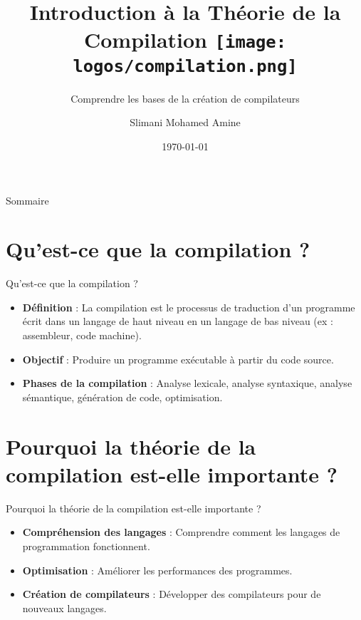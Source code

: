 \documentclass{clbeamer2024}
\title{
        Introduction à la Théorie de la Compilation
	\texttt{[image: logos/compilation.png]} \hfill
}
\subtitle{Comprendre les bases de la création de compilateurs}
\author{Slimani Mohamed Amine}
\institute{EHTP}
\date{\today}
\begin{document}
	\setcounter{framenumber}{-1}
	\frame{\titlepage}
	
	
	
	\begin{frame}{Sommaire}
		\tableofcontents
	\end{frame}
	
	
	\section{Qu'est-ce que la compilation ?}
	\begin{frame}{Qu'est-ce que la compilation ?}
		\begin{itemize}
			\item \textbf{Définition} : La compilation est le processus de traduction d'un programme écrit dans un langage de haut niveau en un langage de bas niveau (ex : assembleur, code machine).
			\item \textbf{Objectif} : Produire un programme exécutable à partir du code source.
			\item \textbf{Phases de la compilation} : Analyse lexicale, analyse syntaxique, analyse sémantique, génération de code, optimisation.
		\end{itemize}
	\end{frame}
	
	\section{Pourquoi la théorie de la compilation est-elle importante ?}
	\begin{frame}{Pourquoi la théorie de la compilation est-elle importante ?}
		\begin{itemize}
			\item \textbf{Compréhension des langages} : Comprendre comment les langages de programmation fonctionnent.
			\item \textbf{Optimisation} : Améliorer les performances des programmes.
			\item \textbf{Création de compilateurs} : Développer des compilateurs pour de nouveaux langages.
		\end{itemize}
	\end{frame}
	
\end{document}
